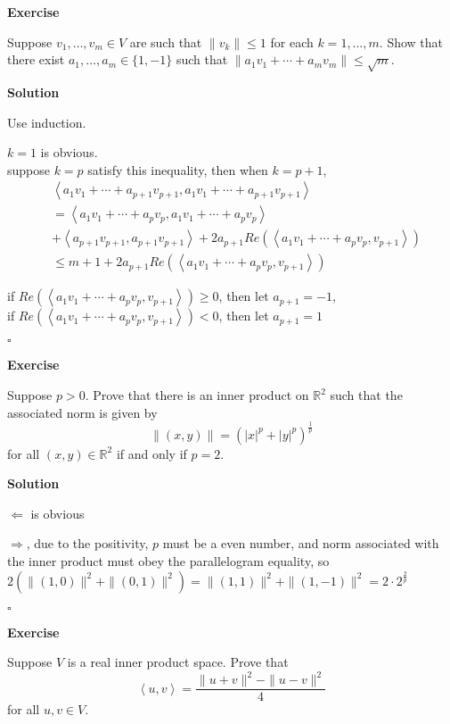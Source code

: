 \documentclass{article}
\newenvironment{exercise}{%
{\textbf{Exercise\\}
    }
}{
}
\newenvironment{solution}{%
{
    \textbf{Solution\\}
    }
}{
  \hfill $\square$ 
  \par\bigskip 
}
\newcommand{\RR}{\mathbb{R}}
\begin{document}
\begin{CJK}{UTF8}{gkai}
\begin{exercise}
    Suppose $v_1,\ldots,v_m \in V$ are such that $\|v_k\| \leq 1$ for each $k = 1,\ldots,m$. Show that there exist $a_1,\ldots,a_m \in \{1,-1\}$ such that $\|a_1v_1 + \cdots+a_mv_m\| \leq \sqrt{m}$.   
\end{exercise}

\begin{solution}
    Use induction.

    $k = 1$ is obvious.\\

    suppose $k = p$ satisfy this inequality, then when $k = p + 1$,
    \[
    \begin{aligned}
        &\left<a_1v_1 + \cdots+a_{p + 1}v_{p + 1},a_1v_1 + \cdots+a_{p +1}v_{p + 1}\right>\\
        &=\left<a_1v_1 + \cdots+a_{p}v_{p},a_1v_1 + \cdots+a_{p}v_{p}\right> \\
        &+ \left<a_{p + 1}v_{p + 1},a_{p +1}v_{p + 1}\right> + 2a_{p +1} Re(\left<a_1v_1 + \cdots+a_{p}v_{p},v_{p + 1}\right>) \\
        &\leq m + 1 + 2a_{p +1} Re(\left<a_1v_1 + \cdots+a_{p}v_{p},v_{p + 1}\right>)
    \end{aligned} 
    \]

    if $Re(\left<a_1v_1 + \cdots+a_{p}v_{p},v_{p + 1}\right>) \geq 0$, then let $a_{p + 1} = -1$,\\
    
    if $Re(\left<a_1v_1 + \cdots+a_{p}v_{p},v_{p + 1}\right>) < 0$, then let $a_{p + 1} = 1$
\end{solution}

\begin{exercise}
    Suppose $p > 0$. Prove that there is an inner product on $\RR^2$ such that the associated norm is given by
    \[\|(x, y)\| = (|x|^p + |y|^p)^\frac{1}{p}\]
    for all $(x,y) \in \RR^2$ if and only if $p = 2$.
\end{exercise}

\begin{solution}
    $\Leftarrow$ is obvious

    $\Rightarrow$, due to the positivity, $p$ must be a even number, and norm associated with the inner product must obey the parallelogram equality, so $2(\|(1,0)\|^2 + \|(0,1)\|^2) = \|(1,1)\|^2 + \|(1,-1)\|^2 = 2 \cdot 2^\frac{2}{p}$
\end{solution}

\begin{exercise}
    Suppose $V$ is a real inner product space. Prove that
    \[\left<u, v\right> = \dfrac{\|u+v\|^2 -\|u-v\|^2}{4}\]
    for all $u,v \in V$.


\end{exercise}
\end{CJK}
\end{document}

